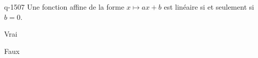\begin{truefalse}{q-1507}
Une fonction affine de la forme  $x\mapsto ax+b$ est linéaire si et seulement si $b=0$.
\item* Vrai
\item Faux
\end{truefalse}

